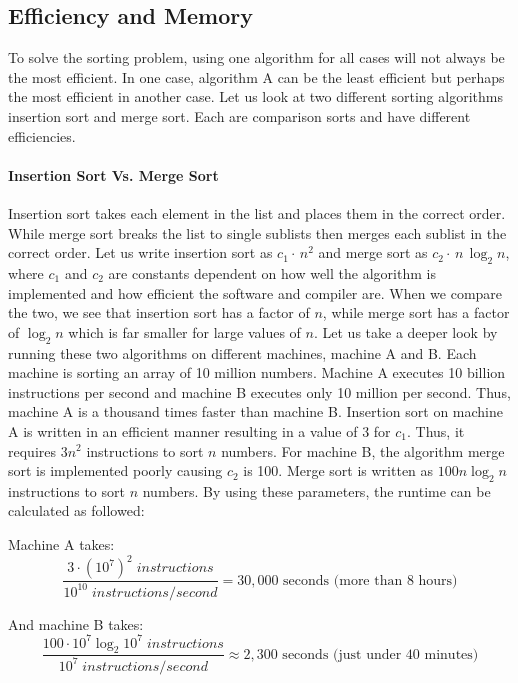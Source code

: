 \documentclass[12pt]{article}
\begin{document}
	\subsection{Efficiency and Memory}
	
	To solve the sorting problem, using one algorithm for all cases will not always be the most efficient.
	In one case, algorithm A can be the least efficient but perhaps the most efficient in another case.
	Let us look at two different sorting algorithms insertion sort and merge sort.
	Each are comparison sorts and have different efficiencies.
	
	\paragraph{Insertion Sort Vs. Merge Sort}
	
	Insertion sort takes each element in the list and places them in the correct order.
	While merge sort breaks the list to single sublists then merges each sublist in the correct order.
	Let us write insertion sort as $c_1 \cdot\,n^2$ and merge sort as $c_2 \cdot\,n\,\log_2{n}$, where $c_1$ and $c_2$ are constants dependent on how well the algorithm is implemented and how efficient the software and compiler are.
	When we compare the two, we see that insertion sort has a factor of $n$, while merge sort has a factor of $\log_2{n}$ which is far smaller for large values of $n$.
	Let us take a deeper look by running these two algorithms on different machines, machine A and B.
	Each machine is sorting an array of 10 million numbers.
	Machine A executes 10 billion instructions per second and machine B executes only 10 million per second.
	Thus, machine A is a thousand times faster than machine B.
	Insertion sort on machine A is written in an efficient manner resulting in a value of 3 for $c_1$.
	Thus, it requires  $3n^2$ instructions to sort $n$ numbers.
	For machine B, the algorithm merge sort is implemented poorly causing $c_2$ is 100.
	Merge sort is written as $100 n\log_2{n}$ instructions to sort $n$ numbers.
	By using these parameters, the runtime can be calculated as followed:
	
	Machine A takes:
	\begin{equation}
	\frac{3\cdot(10^7)^2 \;instructions}{10^{10} \;instructions/\!second}=30,000\mbox{ seconds (more than 8 hours)}
	\end{equation}
	
	And machine B takes:
	\begin{equation}	
	\frac{100\cdot 10^7\log_2{10^7}\;instructions}{10^{7} \;instructions/\!second}\approx2,300\mbox{ seconds (just under 40 minutes)}
	\end{equation}
	
\end{document}
